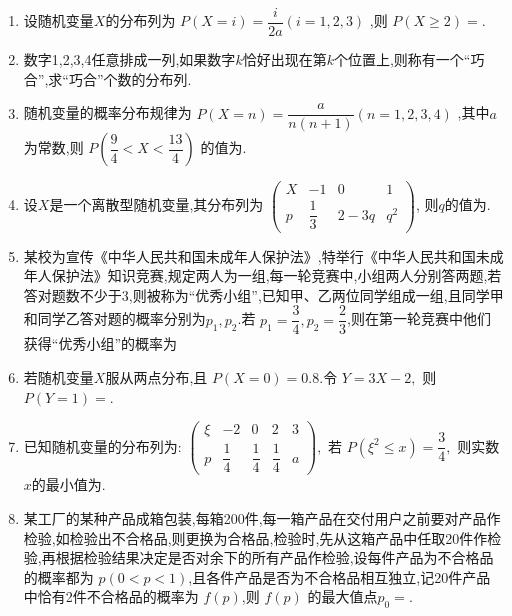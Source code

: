 \begin{enumerate}


\item 设随机变量$X$的分布列为 $P(X=i)=\dfrac{i}{2a}(i=1,2,3)$ ,则 $P(X\ge2)=$.

\item 数字1,2,3,4任意排成一列,如果数字$k$恰好出现在第$k$个位置上,则称有一个“巧合”,求“巧合”个数的分布列.

\item 随机变量的概率分布规律为 $P(X=n)=\dfrac{a}{n(n+1)}(n=1,2,3,4)$ ,其中$a$为常数,则 $P\left(\dfrac{9}{4}<X<\dfrac{13}{4}\right)$ 的值为.

\item 设$X$是一个离散型随机变量,其分布列为 $\begin{pmatrix}X&-1&0&1\\ p&\dfrac{1}{3}&2-3q&q^{2}\end{pmatrix}$, 则$q$的值为.

\item 某校为宣传《中华人民共和国未成年人保护法》,特举行《中华人民共和国未成年人保护法》知识竞赛,规定两人为一组,每一轮竞赛中,小组两人分别答两题,若答对题数不少于3,则被称为“优秀小组”,已知甲、乙两位同学组成一组,且同学甲和同学乙答对题的概率分别为$p_1, p_2$.若 $p_1=\dfrac{3}{4}, p_2=\dfrac{2}{3}$,则在第一轮竞赛中他们获得“优秀小组”的概率为

\item 若随机变量$X$服从两点分布,且 $P(X=0)=0.8$.令 $Y=3X-2,$ 则 $P(Y=1)=$.

\item 已知随机变量的分布列为: $\begin{pmatrix}\xi&-2&0&2&3\\ p&\dfrac{1}{4}&\dfrac{1}{4}&\dfrac{1}{4}&a\end{pmatrix},$ 若 $P(\xi^{2}\le x)=\dfrac{3}{4},$ 则实数$x$的最小值为.

\item 某工厂的某种产品成箱包装,每箱200件,每一箱产品在交付用户之前要对产品作检验,如检验出不合格品,则更换为合格品,检验时,先从这箱产品中任取20件作检验,再根据检验结果决定是否对余下的所有产品作检验,设每件产品为不合格品的概率都为 $p(0<p<1)$,且各件产品是否为不合格品相互独立,记20件产品中恰有2件不合格品的概率为 $f(p)$,则 $f(p)$ 的最大值点$p_0=$.


\end{enumerate}
